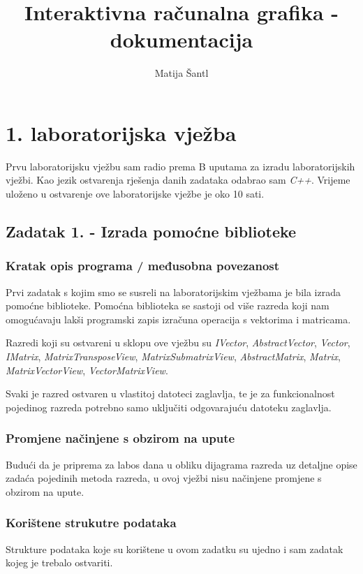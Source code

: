 \documentclass{report}
\author{Matija Šantl}
\title{Interaktivna računalna grafika - dokumentacija}
\begin{document}
\maketitle
\tableofcontents

\chapter{1. laboratorijska vježba}
Prvu laboratorijsku vježbu sam radio prema B uputama za izradu laboratorijskih vježbi. Kao jezik ostvarenja rješenja danih zadataka odabrao sam \textit{C++}. Vrijeme uloženo u ostvarenje ove laboratorijske vježbe je oko 10 sati. 

\section{Zadatak 1. - Izrada pomoćne biblioteke}

\subsection{Kratak opis programa / međusobna povezanost}
Prvi zadatak s kojim smo se susreli na laboratorijskim vježbama je bila izrada pomoćne biblioteke. Pomoćna biblioteka se sastoji od više razreda koji nam omogućavaju lakši programski zapis izračuna operacija s vektorima i matricama.

Razredi koji su ostvareni u sklopu ove vježbu su \textit{IVector}, \textit{AbstractVector}, \textit{Vector}, \textit{IMatrix}, \textit{MatrixTransposeView}, \textit{MatrixSubmatrixView}, \textit{AbstractMatrix}, \textit{Matrix}, \textit{MatrixVectorView}, \textit{VectorMatrixView}.

Svaki je razred ostvaren u vlastitoj datoteci zaglavlja, te je za funkcionalnost pojedinog razreda potrebno samo uključiti odgovarajuću datoteku zaglavlja.

\subsection{Promjene načinjene s obzirom na upute}
Budući da je priprema za labos dana u obliku dijagrama razreda uz detaljne opise zadaća pojedinih metoda razreda, u ovoj vježbi nisu načinjene promjene s obzirom na upute.

\subsection{Korištene strukutre podataka}
Strukture podataka koje su korištene u ovom zadatku su ujedno i sam zadatak kojeg je trebalo ostvariti.
\end{document}

